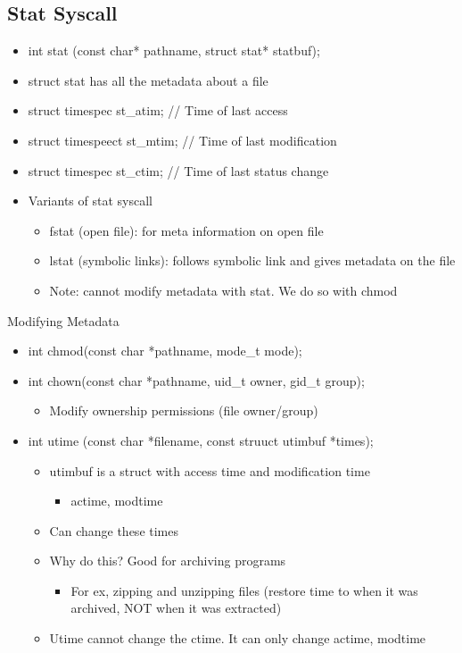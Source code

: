 \subsection{Stat Syscall}
\begin{itemize}
    \item int stat (const char* pathname, struct stat* statbuf);
    \item struct stat has all the metadata about a file
    \item struct timespec st\_atim; // Time of last access
    \item struct timespeect st\_mtim; // Time of last modification
    \item struct timespec st\_ctim; // Time of last status change
    \item Variants of stat syscall
    \begin{itemize}
        \item fstat (open file): for meta information on open file
        \item lstat (symbolic links): follows symbolic link and gives metadata on the file
        \item Note: cannot modify metadata with stat. We do so with chmod
    \end{itemize}
\end{itemize}
Modifying Metadata
\begin{itemize}
    \item int chmod(const char *pathname, mode\_t mode);
    \item int chown(const char *pathname, uid\_t owner, gid\_t group);
    \begin{itemize}
        \item Modify ownership permissions (file owner/group)
    \end{itemize}
    \item int utime (const char *filename, const struuct utimbuf *times);
    \begin{itemize}
        \item utimbuf is a struct with access time and modification time
        \begin{itemize}
            \item actime, modtime
        \end{itemize}
        \item Can change these times
        \item Why do this? Good for archiving programs
        \begin{itemize}
            \item For ex, zipping and unzipping files (restore time to when it was archived, NOT when it was extracted)
        \end{itemize}
        \item Utime cannot change the ctime. It can only change actime, modtime
    \end{itemize}
\end{itemize}
